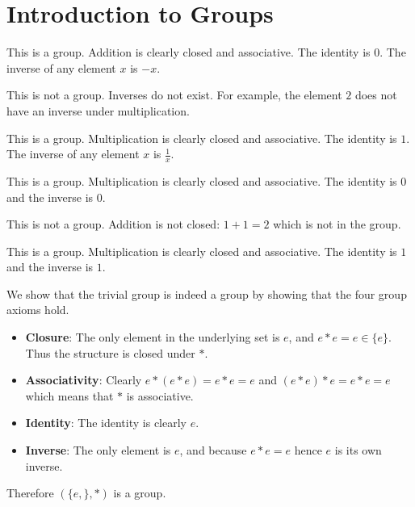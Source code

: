 \section{Introduction to Groups}
\begin{questions}
    \item \begin{partquestions}{\alph*}
        \item This is a group. Addition is clearly closed and associative. The identity is 0. The inverse of any element $x$ is $-x$.
        \item This is not a group. Inverses do not exist. For example, the element $2$ does not have an inverse under multiplication.
        \item This is a group. Multiplication is clearly closed and associative. The identity is $1$. The inverse of any element $x$ is $\frac1x$.
        \item This is a group. Multiplication is clearly closed and associative. The identity is $0$ and the inverse is $0$.
        \item This is not a group. Addition is not closed: $1 + 1 = 2$ which is not in the group.
        \item This is a group. Multiplication is clearly closed and associative. The identity is $1$ and the inverse is $1$.
    \end{partquestions}

    \item We show that the trivial group is indeed a group by showing that the four group axioms hold.
    \begin{itemize}
        \item \textbf{Closure}: The only element in the underlying set is $e$, and $e \ast e = e \in \{e\}$. Thus the structure is closed under $\ast$.
        \item \textbf{Associativity}: Clearly $e \ast (e \ast e) = e \ast e = e$ and $(e \ast e) \ast e = e \ast e = e$ which means that $\ast$ is associative.
        \item \textbf{Identity}: The identity is clearly $e$.
        \item \textbf{Inverse}: The only element is $e$, and because $e \ast e = e$ hence $e$ is its own inverse.
    \end{itemize}
    Therefore $(\{e,\}, \ast)$ is a group.
\end{questions}
